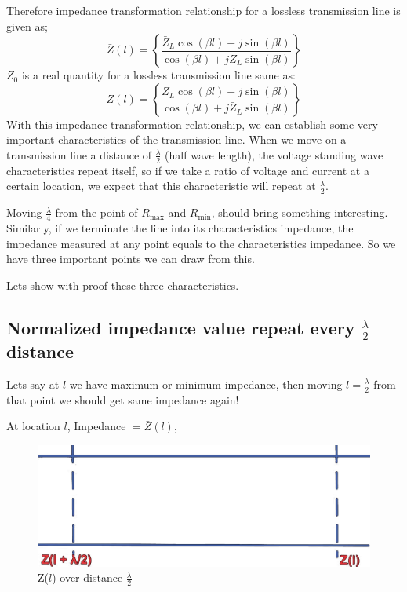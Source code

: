 Therefore impedance transformation relationship for a lossless transmission line is given as;
\begin{equation}
\bar{Z}(l) = \left\lbrace \frac{\bar{Z}_L\cos(\beta l) + j\sin(\beta l)}{\cos(\beta l) + j\bar{Z}_L\sin(\beta l)}\right\rbrace
\label{eqn:implossless}
\end{equation}
$Z_0$ is a real quantity for a lossless transmission line same as:
\begin{equation}
\bar{Z}(l) = \left\lbrace \frac{\bar{Z}_L\cos(\beta l) + j\sin(\beta l)}{\cos(\beta l) + j\bar{Z}_L\sin(\beta l)}\right\rbrace
\label{eqn:implosslessnorm}
\end{equation}
With this impedance transformation relationship, we can establish some very important characteristics of the transmission line. When we move on a transmission line a distance of $\frac{\lambda}{2}$ (half wave length), the voltage standing wave characteristics repeat itself, so if we take a ratio of voltage and current at a certain location, we expect that this characteristic will repeat at $\frac{\lambda}{2}$.

Moving $\frac{\lambda}{4}$ from the point of $R_{\max}$ and $R_{\min}$, should bring something interesting. Similarly, if we terminate the line into its characteristics impedance, the impedance measured at any point equals to the characteristics impedance. So we have three important points we can draw from this.

Lets show with proof these three characteristics.

\subsection{Normalized impedance value repeat every $\frac{\lambda}{2}$ distance}
Lets say at $l$ we have maximum or minimum impedance, then moving $l=\frac{\lambda}{2}$ from that point we should get same impedance again!

At location $l$, Impedance $= \bar{Z}(l)$,
\begin{figure}[h]
\centering
\includegraphics[width=0.8\linewidth]{./graphics/6}
\caption{Z($l$) over distance $\frac{\lambda}{2}$}
\label{fig:astyuif}
\end{figure}

